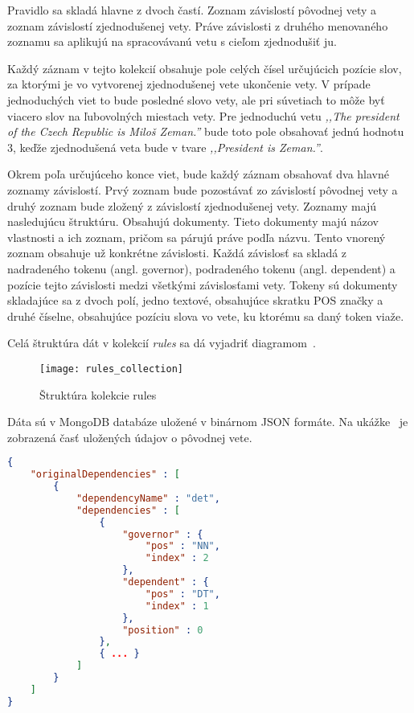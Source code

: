 Pravidlo sa skladá hlavne z dvoch častí. Zoznam závislostí pôvodnej vety a zoznam závislostí zjednodušenej vety. Práve závislosti z druhého menovaného zoznamu sa aplikujú na spracovávanú vetu s cieľom zjednodušiť ju.

Každý záznam v tejto kolekcií obsahuje pole celých čísel určujúcich pozície slov, za ktorými je vo vytvorenej zjednodušenej vete ukončenie vety. V prípade jednoduchých viet to bude posledné slovo vety, ale pri súvetiach to môže byť viacero slov na ľubovolných miestach vety. Pre jednoduchú vetu \textit{,,The president of the Czech Republic is Miloš Zeman.''} bude toto pole obsahovať jednú hodnotu 3, keďže zjednodušená veta bude v tvare \textit{,,President is Zeman.''}.

Okrem poľa určujúceho konce viet, bude každý záznam obsahovať dva hlavné zoznamy závislostí. Prvý zoznam bude pozostávať zo závislostí pôvodnej vety a druhý zoznam bude zložený z závislostí zjednodušenej vety. Zoznamy majú nasledujúcu štruktúru. Obsahujú dokumenty. Tieto dokumenty majú názov vlastnosti a ich zoznam, pričom sa párujú práve podľa názvu. Tento vnorený zoznam obsahuje už konkrétne závislosti. Každá závislosť sa skladá z nadradeného tokenu (angl. governor), podradeného tokenu (angl. dependent) a pozície tejto závislosti medzi všetkými závislosťami vety. Tokeny sú dokumenty skladajúce sa z dvoch polí, jedno textové, obsahujúce skratku POS značky a druhé číselne, obsahujúce pozíciu slova vo vete, ku ktorému sa daný token viaže.

Celá štruktúra dát v kolekcií \textit{rules} sa dá vyjadriť diagramom~.

\begin{figure}[H]
	\begin{center}\texttt{[image: rules\_collection]}\end{center}
	\caption[Štruktúra kolekcie rules]{Štruktúra kolekcie rules}\label{fig:rules_collection_structure}
\end{figure}

Dáta sú v MongoDB databáze uložené v binárnom JSON formáte. Na ukážke~ je zobrazená časť uložených údajov o pôvodnej vete.

\begin{lstlisting}[language = json, caption={Ukážka dát kolekcie rules}, label = {code:collection_rules_data_example}]
{  
	"originalDependencies" : [  
		{  
			"dependencyName" : "det",
			"dependencies" : [  
				{  
					"governor" : {  
						"pos" : "NN",
						"index" : 2
					},
					"dependent" : {  
						"pos" : "DT",
						"index" : 1
					},
					"position" : 0
				},
				{ ... }
			]
		}
	]
}
\end{lstlisting}

